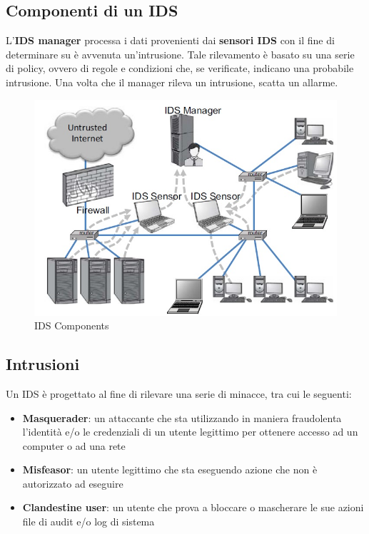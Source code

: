 \subsection{Componenti di un IDS}
L'\textbf{IDS manager} processa i dati provenienti dai \textbf{sensori IDS} con il fine di determinare su è avvenuta un'intrusione. Tale rilevamento è basato su una serie di policy, ovvero di regole e condizioni che, se verificate, indicano una probabile intrusione. Una volta che il manager rileva un intrusione, scatta un allarme.

\begin{figure}[htbp]
	\centering
	\includegraphics[width=0.5\linewidth]{Immagini/firewalls/IDS.png}
	\caption{IDS Components} 	
	\label{fig:IDS_components}
\end{figure}

\subsection{Intrusioni}
Un IDS è progettato al fine di rilevare una serie di minacce, tra cui le seguenti:

\begin{itemize}
\item \textbf{Masquerader}: un attaccante che sta utilizzando in maniera fraudolenta l'identità e/o le credenziali di un utente legittimo per ottenere accesso ad un computer o ad una rete
\item \textbf{Misfeasor}: un utente legittimo che sta eseguendo azione che non è autorizzato ad eseguire
\item \textbf{Clandestine user}: un utente che prova a bloccare o mascherare le sue azioni file di audit e/o log di sistema
\end{itemize}

